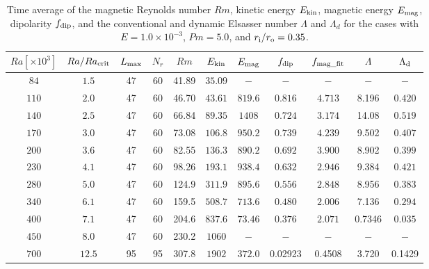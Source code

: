 \begin{table}
\caption{Time average of the magnetic Reynolds number $Rm$, kinetic energy $E_{\rm kin}$, magnetic energy $E_{\rm mag}$, dipolarity $f_{\rm dip}$, and {\color{red} the conventional and dynamic Elsasser number $\Lambda$ and $\Lambda_{d}$ for the cases with $E = 1.0 \times 10^{-3}$, $Pm = 5.0$, and} $r_{\rm i}/r_{\rm o} = 0.35$.}
  \begin{tabular}{ccccccccccc}
    \hline
     $Ra[\times 10^3]$  &  $Ra/Ra_{\rm crit}$& 
     {\color{red} $L_{\rm max}$} & {\color{red} $N_{r}$} & {\color{red} $Rm$} & $E_{\rm kin}$  &  $E_{\rm mag}$ & $f_{\rm dip}$ & $f_{\rm mag\_fit}$ & $\Lambda$ & $\Lambda_{\rm d}$\\
    \hline
      $84$  & $1.5$ & 47 & 60 & 41.89 &   $35.09$ & $-$ & $-$ & $-$ & $-$ & $-$ \\
     $110$  & $2.0$ & 47 & 60 & 46.70 &  $43.61$ & $819.6$ & $0.816$ & $4.713$ & 8.196 & $0.420$\\
     $140$  & $2.5$ & 47 & 60 & 66.84 &  $89.35$ & $1408$ & $0.724$ & $3.174$ & 14.08 & $0.519$\\
     $170$  & $3.0$ & 47 & 60 & 73.08 &  $106.8$ & $950.2$ & $0.739$ & $4.239$ & 9.502 & $0.407$\\
     $200$  & $3.6$ & 47 & 60 & 82.55 &  $136.3$ & $890.2$ & $0.692$ & $3.900$ & 8.902 & $0.399$\\
     $230$  & $4.1$ & 47 & 60 & 98.26 &  $193.1$ & $938.4$ & $0.632$ & $2.946$ & 9.384 & $0.421$\\
     $280$  & $5.0$ & 47 & 60 & 124.9 &  $311.9$ & $895.6$ & $0.556$ & $2.848$ & 8.956 & $0.383$\\
     $340$  & $6.1$ & 47 & 60 & 159.5 &  $508.7$ & $713.6$ & $0.480$ & $2.006$ & 7.136 & $0.294$\\
     $400$  & $7.1$ & 47 & 60 & 204.6 &  $837.6$ & $73.46$ & $0.376$ & $2.071$ & 0.7346 & $0.035$\\
     $450$  & $8.0$ & 47 & 60 & 230.2 &  $1060$ & $-$ & $-$ & $-$ & $-$ & $-$ \\
     $700$  & $12.5$ & 95 & 95 & 307.8 & $1902$ & $372.0$ & 0.02923 & 0.4508 & 3.720 & 0.1429 \\
    \hline
  \end{tabular}
\label{table:Summary_35}
 \end{table}
%
\begin{table}
\label{table:Summary_3115}
 \end{table}

